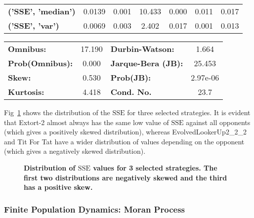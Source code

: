 \documentclass[10pt,letterpaper]{article}
\newlength\savedwidth
\newcommand\thickhline{\noalign{\global\savedwidth\arrayrulewidth\global\arrayrulewidth 2pt}%
\hline
\noalign{\global\arrayrulewidth\savedwidth}}
\newcommand{\SSe}{\text{SSE}}
\begin{document}
\begin{table}[!hbtp]
\begin{tabular}{lcccccc}
\textbf{('SSE', 'median')} &       0.0139  &        0.001     &    10.433  &         0.000        &        0.011    &        0.017     \\
\textbf{('SSE', 'var')}    &       0.0069  &        0.003     &     2.402  &         0.017        &        0.001    &        0.013     \\
\hline
\end{tabular}
\begin{tabular}{lclc}
\thickhline
\textbf{Omnibus:}       & 17.190 & \textbf{  Durbin-Watson:     } &    1.664  \\
\textbf{Prob(Omnibus):} &  0.000 & \textbf{  Jarque-Bera (JB):  } &   25.453  \\
\textbf{Skew:}          &  0.530 & \textbf{  Prob(JB):          } & 2.97e-06  \\
\textbf{Kurtosis:}      &  4.418 & \textbf{  Cond. No.          } &     23.7  \\
\hline
\end{tabular}
\end{table}


Fig~\ref{fig:sserror_distribution_for_selection_of_strategies} shows the
distribution of the \(\SSe\) for three selected strategies. It is evident that
Extort-2 almost always has the same low value of \(\SSe\) against all opponents
(which gives a positively skewed distribution), whereas EvolvedLookerUp2\_2\_2
and Tit For Tat have a wider distribution of values depending on the opponent
(which gives a negatively skewed distribution).

\begin{figure}[!hbtp]
    \centering
    \caption{{\bf Distribution of \(\SSe\) values for 3 selected strategies. The
    first two distributions are negatively skewed and the third has a positive
    skew.}}
    \label{fig:sserror_distribution_for_selection_of_strategies}
\end{figure}

\subsubsection*{Finite Population Dynamics: Moran Process}
\end{document}
